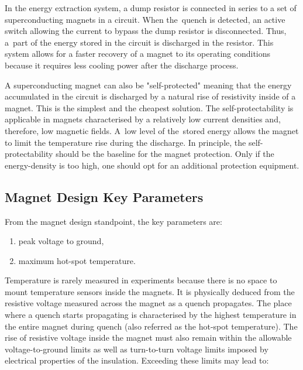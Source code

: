 In the energy extraction system, a dump resistor is connected in series to a set of superconducting magnets in a circuit. When the~quench is detected, an active switch allowing the current to bypass the dump resistor is disconnected.  Thus, a~part of the energy stored in the circuit is discharged in the resistor. This system allows for a faster recovery of a magnet to its operating conditions because it requires less cooling power after the discharge process.~\cite{salmiquenchheateroptimization}

A superconducting magnet can also be "self-protected" meaning that the energy accumulated in the circuit is discharged by a natural rise of resistivity inside of a magnet. This is the simplest and the cheapest solution. The self-protectability is applicable in magnets characterised by a relatively low current densities and, therefore, low magnetic fields. A~low level of the~stored energy allows the magnet to limit the temperature rise during the discharge. In principle, the self-protectability should be the baseline for the magnet protection. Only if the energy-density is too high, one should opt for an additional protection equipment.

\subsection{Magnet Design Key Parameters}

From the magnet design standpoint, the key parameters are:
\begin{enumerate}
    \item peak voltage to ground,
    \item maximum hot-spot temperature.
\end{enumerate}

Temperature is rarely measured in experiments because there is no space to mount temperature sensors inside the magnets. It is physically deduced from the resistive voltage measured across the magnet as a quench propagates. The place where a quench starts propagating is characterised by the highest temperature in the entire magnet during quench (also referred as the hot-spot temperature). The rise of resistive voltage inside the magnet must also remain within the allowable voltage-to-ground limits as well as turn-to-turn voltage limits imposed by electrical properties of the insulation. Exceeding these limits may lead to:

